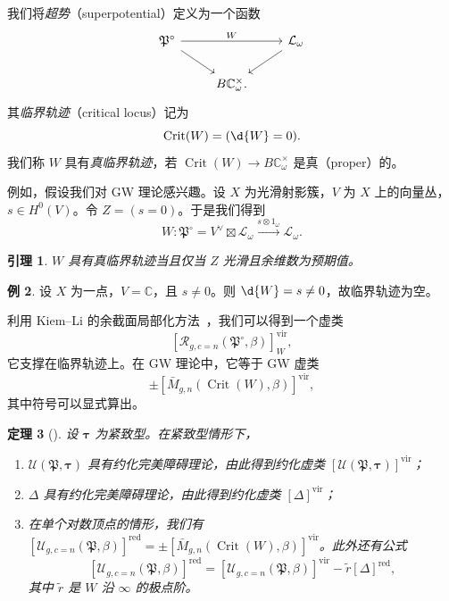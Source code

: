 \documentclass{amsart}
\newtheorem{thm}{定理}[section]
\newtheorem{lem}[thm]{引理}
\theoremstyle{definition}
\newtheorem{exm}[thm]{例}
\theoremstyle{remark}
\theoremstyle{plain}
\theoremstyle{definition}
\theoremstyle{remark}
\newcommand{\C}{\mathbb{C}}
\newcommand{\mc}[1]{\mathcal{#1}}
\newcommand{\mf}[1]{\mathfrak{#1}}
\newcommand{\mr}[1]{\mathrm{#1}}
\newcommand{\on}[1]{\operatorname{#1}}
\newcommand{\1}{\mathbf{1}}
\newcommand{\2}{\mathbf{2}}
\newcommand{\3}{\mathbf{3}}
\newcommand{\vir}{\mr{vir}}
\begin{document}
我们将\textit{超势}（superpotential）定义为一个函数
\begin{equation*}
\begin{tikzcd}
    \mf{P}^{\circ} \ar{rr}{W} \ar{dr} && \mc{L}_{\omega} \ar{dl} \\
    & B \C_{\omega}^{\times}.
\end{tikzcd}
\end{equation*}
其\textit{临界轨迹}（critical locus）记为
\[ \on{Crit}(W) = (\d{W} = 0). \]
我们称 \(W\) 具有\textit{真临界轨迹}，若 \(\on{Crit}(W) \to B\C_{\omega}^{\times}\) 是真（proper）的。

例如，假设我们对 GW 理论感兴趣。设 \(X\) 为光滑射影簇，\(V\) 为 \(X\) 上的向量丛，\(s \in H^0(V)\)。令 \(Z = (s = 0)\)。于是我们得到
\[ W \colon \mf{P}^{\circ} = V^{\vee} \boxtimes \mc{L}_{\omega} \xrightarrow{s \otimes 1_{\omega}} \mc{L}_{\omega}. \]

\begin{lem}
    \(W\) 具有真临界轨迹当且仅当 \(Z\) 光滑且余维数为预期值。
\end{lem}

\begin{exm}
    设 \(X\) 为一点，\(V = \C\)，且 \(s \neq 0\)。则 \(\d{W} = s \neq 0\)，故临界轨迹为空。
\end{exm}

利用 Kiem–Li 的余截面局部化方法~\cite{KiemLi2013}，我们可以得到一个虚类
\[ [\mc{R}_{g, c=n}(\mf{P}^{\circ}, \beta)]_W^{\vir}, \]
它支撑在临界轨迹上。在 GW 理论中，它等于 GW 虚类
\[ \pm [\bar{M}_{g,n}(\on{Crit}(W), \beta)]^{\vir}, \]
其中符号可以显式算出。

\begin{thm}[{\cite{CJR2021,CJW2021}}]
    设 \(\bm{\tau}\) 为紧致型。在紧致型情形下，
    \begin{enumerate}
        \item \(\mc{U}(\mf{P}, \bm{\tau})\) 具有约化完美障碍理论，由此得到约化虚类 \([\mc{U}(\mf{P}, \bm{\tau})]^{\vir}\)；
        \item \(\Delta\) 具有约化完美障碍理论，由此得到约化虚类 \([\Delta]^{\vir}\)；
        \item 在单个对数顶点的情形，我们有 \([\mc{U}_{g, c=n}(\mf{P}, \beta)]^{\on{red}} = \pm [\bar{M}_{g,n}(\on{Crit}(W), \beta)]^{\vir}\)。此外还有公式
            \[ [\mc{U}_{g, c=n}(\mf{P}, \beta)]^{\on{red}} = [\mc{U}_{g, c=n}(\mf{P}, \beta)]^{\vir} - \tilde{r} [\Delta]^{\on{red}}, \]
            其中 \(\tilde{r}\) 是 \(W\) 沿 \(\infty\) 的极点阶。
    \end{enumerate}
\end{thm}
\end{document}
